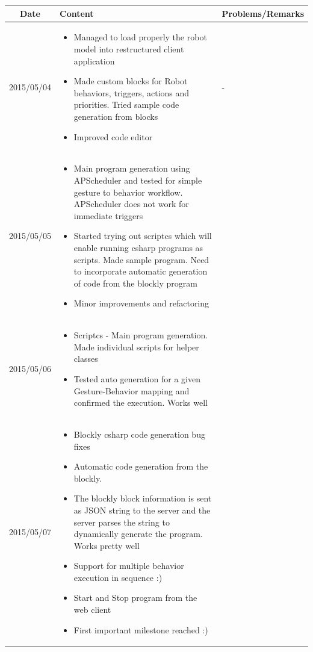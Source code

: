 \documentclass[11pt]{article} %
\begin{document}
\begin{center}
    \begin{longtable}{ | c | p{6cm} | p{5cm} |}
    \hline
    Date & Content & Problems/Remarks \\ 
    \endhead
    \hline    
     2015/05/04         & 
  \begin{itemize}
  \item Managed to load properly the robot model into restructured client application
  \item Made custom blocks for Robot behaviors, triggers, actions and priorities. Tried sample code generation from blocks
  \item Improved code editor
\end{itemize}  
   & - \\
\hline
  										 
 2015/05/05         & 
  \begin{itemize}
  \item Main program generation using APScheduler and tested for simple gesture to behavior workflow. APScheduler does not work for immediate triggers
  \item Started trying out scriptcs which will enable running csharp programs as scripts. Made sample program. Need to incorporate automatic generation of code from the blockly program
  \item Minor improvements and refactoring
\end{itemize}   
& 
 \\
\hline
  										 
  
  2015/05/06        & 
  \begin{itemize}
  \item Scriptcs - Main program generation. Made individual scripts for helper classes
  \item Tested auto generation for a given Gesture-Behavior mapping and confirmed the execution. Works well
  \end{itemize}   
  										 & 
 
  										 \\
  \hline
  
  2015/05/07         & 
  \begin{itemize}
  \item Blockly csharp code generation bug fixes
  \item Automatic code generation from the blockly.
  \item The blockly block information is sent as JSON string to the server and the server parses the string to dynamically generate the program. Works pretty well
  \item Support for multiple behavior execution in sequence :)
  \item Start and Stop program from the web client
  \item First important milestone reached :)
  \end{itemize}
  & 
\\  										 \hline


\end{longtable}
\end{center}
\end{document}
